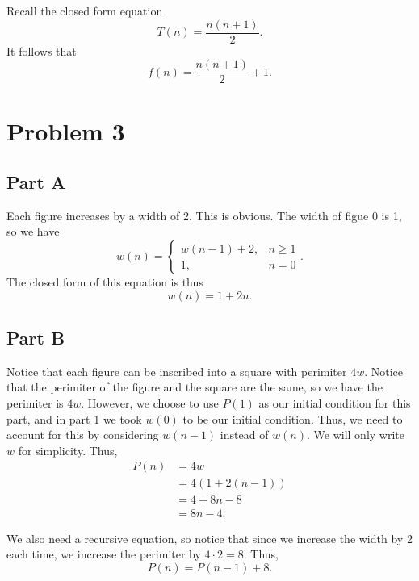 \documentclass[11pt, letterpaper]{article}
\begin{document}
Recall the closed form equation
\[
	T(n)=\frac{n(n+1)}{2}
.\]
It follows that
\[
	f(n)=\frac{n(n+1)}{2}+1
.\]
\section*{Problem 3}
\subsection*{Part A}
\begin{solution}
Each figure increases by a width of 2. This is obvious. The width of figue 0 is 1, so we have
\[
	w(n) =
	\begin{cases}
		w(n-1) + 2,&n\geq 1\\
		1,&n=0
	\end{cases}
.\]
The closed form of this equation is thus
\[
	w(n) = 1 + 2n
.\]
\end{solution}
\subsection*{Part B}
\begin{solution}
Notice that each figure can be inscribed into a square with perimiter $4w$. Notice that the perimiter of the figure and the square are the same, so we have the perimiter is $4w$. However, we choose to use $P(1)$ as our initial condition for this part, and in part 1 we took $w(0)$ to be our initial condition. Thus, we need to account for this by considering $w(n-1)$ instead of $w(n)$. We will only write $w$ for simplicity. Thus,
\begin{align*}
	P(n)&=4w\\
	    &=4(1+2(n-1))\\
	    &=4+8n-8\\
	    &=8n-4
.\end{align*}

We also need a recursive equation, so notice that since we increase the width by 2 each time, we increase the perimiter by $4\cdot 2=8$. Thus,
\[
	P(n)=P(n-1)+8
.\]
\end{solution}
\end{document}
